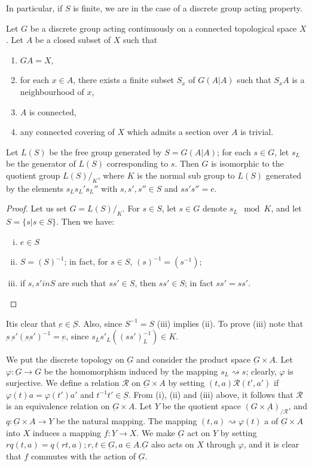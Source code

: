 In particular, if $S$ is finite, we are in the case of a discrete group
acting property. 

\begin{lemma*}
  Let $G$ be a discrete group acting continuously on a connected
  topological space $X$. Let $A$ be a closed subset of $X$ such that  
  \begin{enumerate}[\rm(1)]
  \item $GA = X$, 
  \item for each $x \in A$, there exists a finite subset $S_x$ of
    $G(A|A)$ such that $S_xA$ is a neighbourhood of $x$, 
  \item $A$ is connected, 
  \item any connected covering of $X$ which admits a section over $A$
    is trivial.  
  \end{enumerate}
  
  Let $L(S)$ be the free group generated by $S = G(A|A)$; for each $s
  \in G$, let $s_L$ be the generator of $L(S)$ corresponding to
  $s$. Then $G$ is isomorphic to the quotient group $L(S)/_{K}$, where
  $K$ is the normal sub group to $L(S)$ generated by the elements $s_L
  s_L' s_L''$ with $s, s' , s'' \in S$ and $ss' s'' = e$. 
\end{lemma*}

\begin{proof}
  Let us set $G = L(S)/_{K}$. For $s \in S$, let $s \in G$ denote $s_L
  \mod K$, and let $S = \{ s | s \in S \}$. Then we have: 
  \begin{enumerate}[(i)]
  \item $e \in S$
  \item $S = (S)^{-1}$; in fact, for $s \in S$, $(s)^{-1} = (s^{-1})$;
  \item if $s, s' in S$ are such that $ss' \in S$, then $s s' \in S$;
    in fact $s s' = ss'$. 
  \end{enumerate}
\end{proof}

It\pageoriginale is clear that $\underbar{e} \in \underbar{S}$. Also, since
$S^{-1}=S$ (iii) implies (ii). To prove (iii) note that $
\underbar{s} \,\underbar{s}'(\underbar{s} \underbar{s}')^{-1}=
\underbar{e}$, since $s_L s'_L ((s s')^{-1}_L) \in K$. 

We put the discrete topology on $\underbar{G}$ and consider the
product space $\underbar{G} \times A$. Let $\varphi : \underbar{G} \to
G$ be the homomorphism induced by the mapping $s_L  \rightsquigarrow
s$; clearly, $\varphi$ is surjective. We define a relation
$\mathcal{R}$  on $\underbar{G} \times A$ by setting $(t,a)
\mathcal{R}(t', a')$ if $\varphi(t)a = \varphi(t')a'$ and $t^{-1}t' \in
\underbar{S}$. From (i), (ii) and (iii) above, it follows that
$\mathcal{R}$ is an equivalence relation on $\underbar{G} \times
A$. Let $Y$ be the quotient space $(G \times
\underbar{A})_{/\mathcal{R}}$, and $q: \underbar{G} \times A \to Y$ be
the natural mapping. The mapping $(t, a) \rightsquigarrow \varphi (t)$ a
of $\underbar{G} \times A$ into $X$ induces a mapping $f: Y \to X$. We
make $\underbar{G}$ act on $Y$ by setting $rq (t,a) = q(rt,a); r,t \in
\underbar{G}, a \in A. \underbar{G}$ also acts on $X$ through
$\varphi$, and it is clear that $f$ commutes with the action of
$\underbar{G}$. 

